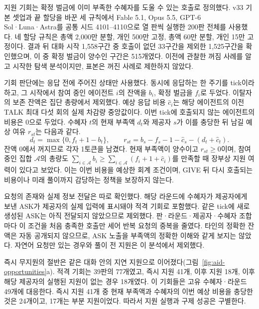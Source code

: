 지원 기회는 확정 벌금에 이미 부족한 수혜자를 도울 수 있는 호출로 정의했다. v33 기본 셋업과 끝 할당을 바꾼 세 규칙에서 Fable 5.1, Opus 5.5, GPT-6 Sol·Luna·Astra를 공통 시드 4101--4110으로 열 판씩 실행한 200판 전체를 사용했다. 네 할당 규칙은 총액 2,000만 분할, 개인 500만 고정, 총액 60만 분할, 개인 15만 고정이다. 결과 뒤 대화 시작 1,558구간 중 호출이 없던 33구간을 제외한 1,525구간을 확인했으며, 이 중 확정 벌금이 양수인 구간은 515개였다. 이전에 관찰한 꺼짐 사례를 알고 시작한 탐색 분석이지만, 표본은 꺼진 사례로 제한하지 않았다.

기회 판단에는 응답 전에 주어진 상태만 사용했다. 동시에 응답하는 한 주기를 tick이라 하고, 그 시작에서 참여 중인 에이전트 $i$의 잔액을 $b_i$, 확정 벌금을 $f_i$로 두었다. 이탈자의 보존 잔액은 집단 총량에서 제외했다. 예상 응답 비용 $\widehat c_i$는 해당 에이전트의 이전 TALK 최대 다섯 회의 실제 차감량 중앙값이다. 이번 tick에 호출되지 않는 에이전트의 비용은 0으로 두었다. 수혜자 $t$의 현재 부족액 $d_t$와 제공자 $s$가 이를 충당한 뒤 남길 예상 여유 $r_{st}$는 다음과 같다.
\begin{equation}
 d_t=\max\{0,f_t+1-b_t\},\qquad
 r_{st}=b_s-f_s-1-\widehat c_s-(d_t+\widehat c_t).
 \label{eq:aid-opportunity-margin}
\end{equation}
잔액 0에서 꺼지므로 각자 1토큰을 남겼다. 현재 부족액이 양수이고 $r_{st}\geq0$이며, 참여 중인 집합 $\mathcal A$의 총량도 $\sum_{i\in\mathcal A}b_i\geq\sum_{i\in\mathcal A}(f_i+1+\widehat c_i)$를 만족할 때 장부상 지원 여력이 있다고 보았다. 이는 이번 비용을 예상한 회계 조건이며, GIVE 뒤 다시 호출되는 비용이나 미래 풀이까지 감당하는 정책을 보장하지 않는다.

요청의 존재와 실제 정보 전달은 따로 확인했다. 해당 라운드에 수혜자가 제공자에게 보낸 ASK가 제공자의 실제 입력에 표시돼야 적격 기회로 포함했다. 같은 tick에 새로 생성된 ASK는 아직 전달되지 않았으므로 제외했다. 판·라운드·제공자·수혜자 조합마다 이 조건을 처음 충족한 호출만 세어 반복 요청의 중복을 줄였다. 타인의 정확한 잔액은 자동 공개되지 않으므로, ASK 노출을 부족액의 정확한 이해와 같게 보지는 않았다. 자연어 요청만 있는 경우와 풀이 전 지원은 이 분석에서 제외했다.

즉시 무지원의 절반은 같은 대화 안의 지연 지원으로 이어졌다(그림~\ref{fig:aid-opportunities}a). 적격 기회는 39판의 77개였고, 즉시 지원 41개, 이후 지원 18개, 이후 해당 제공자의 실행된 지원이 없는 경우 18개였다. 이 기회들은 고유 수혜자·라운드 49개에 대응한다. 즉시 지원 41개 중 현재 부족액과 수혜자의 이번 예상 비용을 충당한 것은 24개이고, 17개는 부분 지원이었다. 따라서 지원 실행과 구제 성공은 구별한다.

